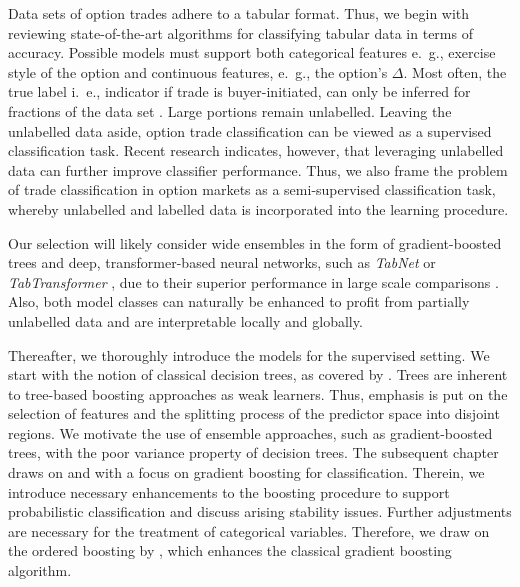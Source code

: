Data sets of option trades adhere to a tabular format.  Thus, we begin with reviewing state-of-the-art algorithms for classifying tabular data in terms of accuracy. Possible models must support both categorical features e.~g., exercise style of the option and continuous features, e.~g., the option's $\Delta$. Most often, the true label i.~e., indicator if trade is buyer-initiated, can only be inferred for fractions of the data set \autocites{grauerOptionTradeClassification2022}{savickasInferringDirectionOption2003}. Large portions remain unlabelled. Leaving the unlabelled data aside, option trade classification can be viewed as a supervised classification task. Recent research \autocites{arikTabNetAttentiveInterpretable2020}{huangTabTransformerTabularData2020}{yoonVIMEExtendingSuccess2020} indicates, however, that leveraging unlabelled data can further improve classifier performance. Thus, we also frame the problem of trade classification in option markets as a semi-supervised classification task, whereby unlabelled and labelled data is incorporated into the learning procedure. 

Our selection will likely consider wide ensembles in the form of gradient-boosted trees and deep, transformer-based neural networks, such as \textit{TabNet} \autocite{arikTabNetAttentiveInterpretable2020} or \textit{TabTransformer} \autocite{huangTabTransformerTabularData2020}, due to their superior performance in large scale comparisons \autocites{borisovDeepNeuralNetworks2022}{gorishniyRevisitingDeepLearning2021}{grinsztajnWhyTreebasedModels2022}{shwartz-zivTabularDataDeep2021}. Also, both model classes can naturally be enhanced to profit from partially unlabelled data and are interpretable locally and globally. 

Thereafter, we thoroughly introduce the models for the supervised setting. We start with the notion of classical decision trees, as covered by \textcite{breimanClassificationRegressionTrees2017}. Trees are inherent to tree-based boosting approaches as weak learners. Thus, emphasis is put on the selection of features and the splitting process of the predictor space into disjoint regions. We motivate the use of ensemble approaches, such as gradient-boosted trees, with the poor variance property of decision trees. The subsequent chapter draws on \textcite{hastietrevorElementsStatisticalLearning2009} and \textcite{friedmanGreedyFunctionApproximation2001} with a focus on gradient boosting for classification. Therein, we introduce necessary enhancements to the boosting procedure to support probabilistic classification and discuss arising stability issues. Further adjustments are necessary for the treatment of categorical variables. Therefore, we draw on the ordered boosting by \textcite{prokhorenkovaCatBoostUnbiasedBoosting2018}, which enhances the classical gradient boosting algorithm.

